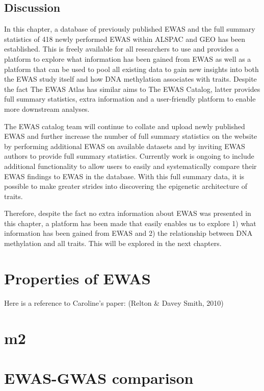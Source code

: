 \documentclass[11pt,twoside]{bristolthesis}
\begin{document}
\hypertarget{discussion}{%
\section{Discussion}\label{discussion}}

In this chapter, a database of previously published EWAS and the full summary statistics of 418 newly performed EWAS within ALSPAC and GEO has been established. This is freely available for all researchers to use and provides a platform to explore what information has been gained from EWAS as well as a platform that can be used to pool all existing data to gain new insights into both the EWAS study itself and how DNA methylation associates with traits. Despite the fact The EWAS Atlas has similar aims to The EWAS Catalog, latter provides full summary statistics, extra information and a user-friendly platform to enable more downstream analyses.

The EWAS catalog team will continue to collate and upload newly published EWAS and further increase the number of full summary statistics on the website by performing additional EWAS on available datasets and by inviting EWAS authors to provide full summary statistics. Currently work is ongoing to include additional functionality to allow users to easily and systematically compare their EWAS findings to EWAS in the database. With this full summary data, it is possible to make greater strides into discovering the epigenetic architecture of traits.

Therefore, despite the fact no extra information about EWAS was presented in this chapter, a platform has been made that easily enables us to explore 1) what information has been gained from EWAS and 2) the relationship between DNA methylation and all traits. This will be explored in the next chapters.

\hypertarget{properties-of-ewas}{%
\chapter{Properties of EWAS}\label{properties-of-ewas}}

Here is a reference to Caroline's paper: (Relton \& Davey Smith, 2010)

\hypertarget{m2}{%
\chapter{m2}\label{m2}}

\hypertarget{ewas-gwas-comparison}{%
\chapter{EWAS-GWAS comparison}\label{ewas-gwas-comparison}}
\end{document}

